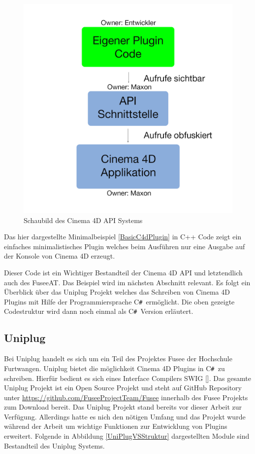 \documentclass[pagesize, paper=a4, fontsize=12pt, titlepage=true, headings=small, headnosepline, abstractoff, liststotoc, nochapterprefix, plainheadsepline, twoside]{scrreprt}
\newcommand{\CSS}{C\texttt{\# }}
\begin{document}
\begin{figure}[ht]
	\centering
  \includegraphics[width=\linewidth]{Bilder/C4D_Api_Schaubild_v1.jpg}
	\caption{Schaubild des Cinema 4D API Systems}
	\label{C4D API Schaubild}
\end{figure}

Das hier dargestellte Minimalbeispiel \ref{BasicC4dPlugin} in C++ Code zeigt ein einfaches minimalistisches Plugin welches beim Ausführen nur eine Ausgabe auf der Konsole von Cinema 4D erzeugt.

\newpage

Dieser Code ist ein Wichtiger Bestandteil der Cinema 4D API und letztendlich auch des FuseeAT. Das Beispiel wird im nächsten Abschnitt relevant. Es folgt ein Überblick über das Uniplug Projekt welches das Schreiben von Cinema 4D Plugins mit Hilfe der Programmiersprache \CSS ermöglicht. Die oben gezeigte  Codestruktur wird dann noch einmal als \CSS Version erläutert.

\subsection{Uniplug}
Bei Uniplug handelt es sich um ein Teil des Projektes Fusee der Hochschule Furtwangen. Uniplug bietet die möglichkeit Cinema 4D Plugins in \CSS zu schreiben. Hierfür bedient es sich eines Interface Compilers SWIG []. Das gesamte Uniplug Projekt ist ein Open Source Projekt und steht auf GitHub Repository unter \url{https://github.com/FuseeProjectTeam/Fusee} innerhalb des Fusee Projekts zum Download bereit. Das Uniplug Projekt stand bereits vor dieser Arbeit zur Verfügung. Allerdings hatte es nich den nötigen Umfang und das Projekt wurde während der Arbeit um wichtige Funktionen zur Entwicklung von Plugins erweitert. Folgende in Abbildung \ref{UniPlugVSStruktur} dargestellten Module sind Bestandteil des Uniplug Systems.
\end{document}
